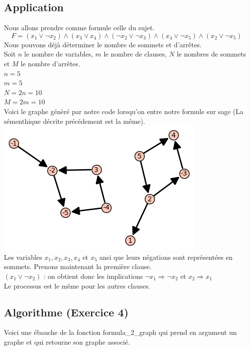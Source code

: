 \documentclass{article}
\begin{document}
    \subsection{Application}
    Nous allons prendre comme formule celle du sujet. 
    \begin{equation*}
        F=(x_1 \lor \neg x_2) \wedge (x_3 \lor x_4) \wedge (\neg x_2 \lor \neg x_3) \wedge (x_4 \lor \neg x_5) \wedge (x_2 \lor \neg x_5)
    \end{equation*}
    Nous pouvons déjà déterminer le nombre de sommets et d'arrêtes. \\
    Soit $n$ le nombre de variables, $m$ le nombre de clauses, $N$ le nombres de sommets et $M$ le nombre d'arrêtes. \\
    $n=5$ \\
    $m=5$ \\
    $N=2n=10$ \\
    $M=2m=10$ \\ 
    Voici le graphe génèré par notre code lorsqu'on entre notre formule sur sage (La sémenthique décrite précédement est la même). \\ 
    \includegraphics{g.png} \\
    Les variables $x_1,x_2,x_3,x_4$ et $x_5$ ansi que leurs négations sont représentées en sommets.
    Prenons maintenant la première clause. \\
    $(x_1 \lor \neg x_2)$ : on obtient donc les implications $\neg x_1 \Longrightarrow \neg x_2$ et $x_2 \Longrightarrow x_1$ \\
    Le processus est le même pour les autres clauses.
    \newpage
    \subsection{Algorithme (Exercice 4)}
    Voici une ébauche de la fonction formula\_2\_graph qui prend en argument un graphe et qui retourne son graphe associé.
\end{document}
